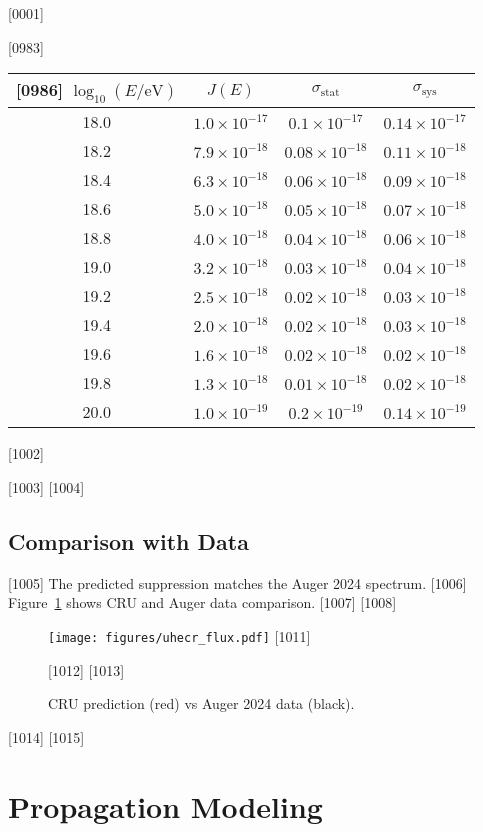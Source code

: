[0001] \documentclass[12pt]{report}
[0002] \usepackage[utf8]{inputenc}
\begin{document}
[0983] \begin{table}[h]
[0984] \centering
[0985] \begin{tabular}{c c c c}
[0986] \toprule
[0987] $\log_{10}(E/\text{eV})$ & $J(E)$ & $\sigma_{\text{stat}}$ & $\sigma_{\text{sys}}$ \\
[0988] \midrule
[0989] 18.0 & $1.0 \times 10^{-17}$ & $0.1 \times 10^{-17}$ & $0.14 \times 10^{-17}$ \\
[0990] 18.2 & $7.9 \times 10^{-18}$ & $0.08 \times 10^{-18}$ & $0.11 \times 10^{-18}$ \\
[0991] 18.4 & $6.3 \times 10^{-18}$ & $0.06 \times 10^{-18}$ & $0.09 \times 10^{-18}$ \\
[0992] 18.6 & $5.0 \times 10^{-18}$ & $0.05 \times 10^{-18}$ & $0.07 \times 10^{-18}$ \\
[0993] 18.8 & $4.0 \times 10^{-18}$ & $0.04 \times 10^{-18}$ & $0.06 \times 10^{-18}$ \\
[0994] 19.0 & $3.2 \times 10^{-18}$ & $0.03 \times 10^{-18}$ & $0.04 \times 10^{-18}$ \\
[0995] 19.2 & $2.5 \times 10^{-18}$ & $0.02 \times 10^{-18}$ & $0.03 \times 10^{-18}$ \\
[0996] 19.4 & $2.0 \times 10^{-18}$ & $0.02 \times 10^{-18}$ & $0.03 \times 10^{-18}$ \\
[0997] 19.6 & $1.6 \times 10^{-18}$ & $0.02 \times 10^{-18}$ & $0.02 \times 10^{-18}$ \\
[0998] 19.8 & $1.3 \times 10^{-18}$ & $0.01 \times 10^{-18}$ & $0.02 \times 10^{-18}$ \\
[0999] 20.0 & $1.0 \times 10^{-19}$ & $0.2 \times 10^{-19}$ & $0.14 \times 10^{-19}$ \\
[1000] \bottomrule
[1001] \end{tabular}
[1002] \end{table}
[1003] 
[1004] \subsection{Comparison with Data}
[1005] The predicted suppression matches the Auger 2024 spectrum.  
[1006] Figure~\ref{fig:uhecr_flux} shows CRU and Auger data comparison.  
[1007] 
[1008] \begin{figure}[h]
[1009] \centering
[1010] \texttt{[image: figures/uhecr\_flux.pdf]}
[1011] \caption{CRU prediction (red) vs Auger 2024 data (black).}
[1012] \label{fig:uhecr_flux}
[1013] \end{figure}
[1014] 
[1015] \section{Propagation Modeling}
\end{document}
